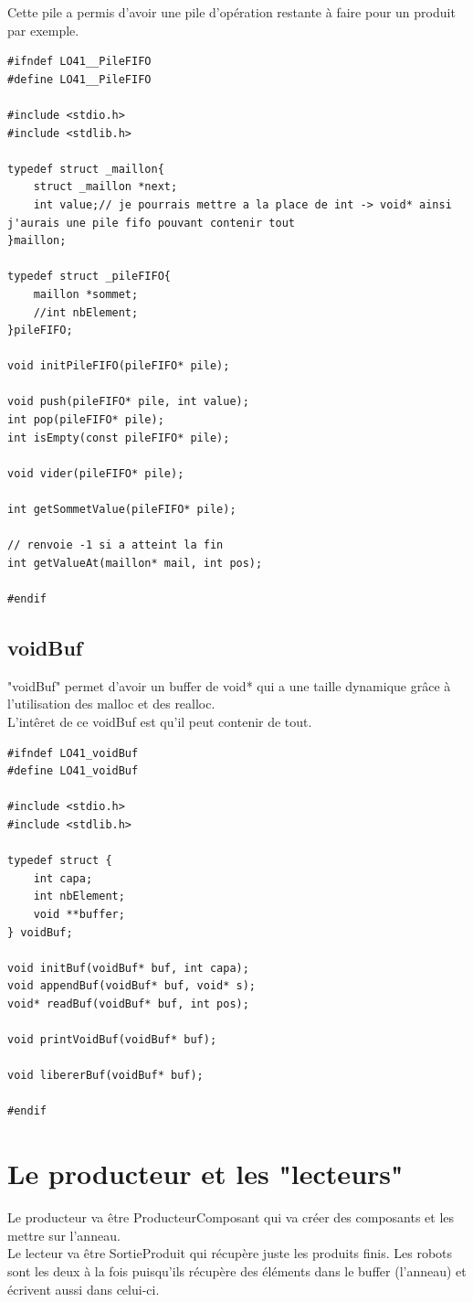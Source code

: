 \documentclass{report}
\begin{document}
Cette pile a permis d'avoir une pile d'opération restante à faire pour un produit par exemple.
\begin{lstlisting}[caption=Représentation de la pile FIFO]
#ifndef LO41__PileFIFO
#define LO41__PileFIFO

#include <stdio.h>
#include <stdlib.h>

typedef struct _maillon{
    struct _maillon *next;
    int value;// je pourrais mettre a la place de int -> void* ainsi j'aurais une pile fifo pouvant contenir tout
}maillon;

typedef struct _pileFIFO{
    maillon *sommet;
    //int nbElement;
}pileFIFO;

void initPileFIFO(pileFIFO* pile);

void push(pileFIFO* pile, int value);
int pop(pileFIFO* pile);
int isEmpty(const pileFIFO* pile);

void vider(pileFIFO* pile);

int getSommetValue(pileFIFO* pile);

// renvoie -1 si a atteint la fin
int getValueAt(maillon* mail, int pos);

#endif
\end{lstlisting}

\subsection{voidBuf}
"voidBuf" permet d'avoir un buffer de void* qui a une taille dynamique grâce à l'utilisation des malloc et des realloc.\\
L'intêret de ce voidBuf est qu'il peut contenir de tout.
\begin{lstlisting}[caption=Représentation d'un buffer de void*]
#ifndef LO41_voidBuf
#define LO41_voidBuf

#include <stdio.h>
#include <stdlib.h>

typedef struct {
    int capa;
    int nbElement;
    void **buffer;
} voidBuf;

void initBuf(voidBuf* buf, int capa);
void appendBuf(voidBuf* buf, void* s);
void* readBuf(voidBuf* buf, int pos);

void printVoidBuf(voidBuf* buf);

void libererBuf(voidBuf* buf);

#endif
\end{lstlisting}

\section{Le producteur et les "lecteurs"}
Le producteur va être ProducteurComposant qui va créer des composants et les mettre sur l'anneau.\\
Le lecteur va être SortieProduit qui récupère juste les produits finis. Les robots sont les deux à la fois puisqu'ils récupère des éléments dans le buffer (l'anneau) et écrivent aussi dans celui-ci.
\end{document}
